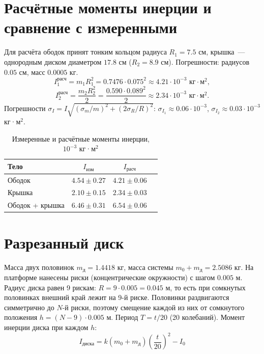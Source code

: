 \documentclass[12pt,a4paper]{article}
\begin{document}
\section{Расчётные моменты инерции и сравнение с измеренными}
Для расчёта ободок принят тонким кольцом радиуса \(R_1 = 7.5\) см, крышка~--- однородным диском диаметром \(17.8\) см (\(R_2 = 8.9\) см). Погрешности: радиусов \(0.05\) см, масс \(0.0005\) кг.
\begin{equation}
    I_1^{\text{расч}} = m_1 R_1^2 = 0.7476 \cdot 0.075^2 \approx 4.21 \cdot 10^{-3} \text{ кг}\cdot\text{м}^2,
\end{equation}
\begin{equation}
    I_2^{\text{расч}} = \frac{m_2 R_2^2}{2} = \frac{0.590 \cdot 0.089^2}{2} \approx 2.34 \cdot 10^{-3} \text{ кг}\cdot\text{м}^2.
\end{equation}
Погрешности \(\sigma_I = I\sqrt{(\sigma_m/m)^2 + (2\sigma_R/R)^2}\): \(\sigma_{I_1} \approx 0.06 \cdot 10^{-3}\), \(\sigma_{I_2} \approx 0.03 \cdot 10^{-3}\) кг·м\(^2\).

\begin{table}[H]
    \centering
    \caption{Измеренные и расчётные моменты инерции, \(10^{-3}\) кг·м\(^2\)}
    \begin{tabular}{lccc}
        \toprule
        Тело & \(I_{\text{изм}}\) & \(I_{\text{расч}}\) \\
        \midrule
        Ободок & \(4.54 \pm 0.27\) & \(4.21 \pm 0.06\)  \\
        Крышка & \(2.10 \pm 0.15\) & \(2.34 \pm 0.03\) \\
        Ободок + крышка & \(6.46 \pm 0.31\) & \(6.54 \pm 0.06\) \\
        
        \bottomrule
    \end{tabular}
\end{table}

\section{Разрезанный диск}
Масса двух половинок \(m_{\text{д}} = 1.4418\) кг, масса системы \(m_0 + m_{\text{д}} = 2.5086\) кг. На платформе нанесены риски (концентрические окружности) с шагом \(0.005\) м. Радиус диска равен 9 рискам: \(R = 9 \cdot 0.005 = 0.045\) м, то есть при сомкнутых половинках внешний край лежит на 9-й риске. Половинки раздвигаются симметрично до \(N\)-й риски, поэтому смещение каждой из них от сомкнутого положения \(h = (N-9)\cdot 0.005\) м. Период \(T = t/20\) (20 колебаний). Момент инерции диска при каждом \(h\):
\begin{equation}
    I_{\text{диска}} = k (m_0 + m_{\text{д}}) \left(\frac{t}{20}\right)^2 - I_0
\end{equation}
\end{document}
